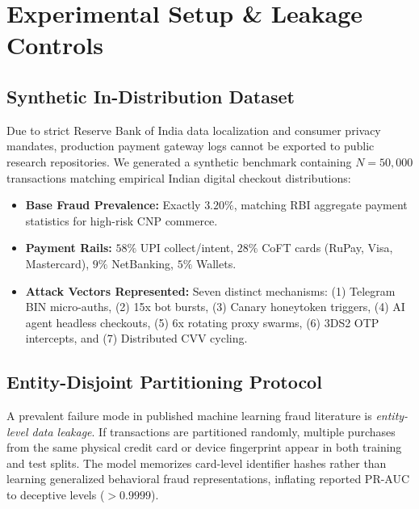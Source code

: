 \documentclass[conference]{IEEEtran}
\begin{document}
\section{Experimental Setup \& Leakage Controls}
\label{sec:setup}

\subsection{Synthetic In-Distribution Dataset}
Due to strict Reserve Bank of India data localization and consumer privacy mandates, production payment gateway logs cannot be exported to public research repositories. We generated a synthetic benchmark containing $N = 50,000$ transactions matching empirical Indian digital checkout distributions:
\begin{itemize}
    \item \textbf{Base Fraud Prevalence:} Exactly $3.20\%$, matching RBI aggregate payment statistics for high-risk CNP commerce.
    \item \textbf{Payment Rails:} $58\%$ UPI collect/intent, $28\%$ CoFT cards (RuPay, Visa, Mastercard), $9\%$ NetBanking, $5\%$ Wallets.
    \item \textbf{Attack Vectors Represented:} Seven distinct mechanisms: (1) Telegram BIN micro-auths, (2) 15x bot bursts, (3) Canary honeytoken triggers, (4) AI agent headless checkouts, (5) 6x rotating proxy swarms, (6) 3DS2 OTP intercepts, and (7) Distributed CVV cycling.
\end{itemize}

\subsection{Entity-Disjoint Partitioning Protocol}
\label{sec:leakage_audit}
A prevalent failure mode in published machine learning fraud literature is \textit{entity-level data leakage}. If transactions are partitioned randomly, multiple purchases from the same physical credit card or device fingerprint appear in both training and test splits. The model memorizes card-level identifier hashes rather than learning generalized behavioral fraud representations, inflating reported PR-AUC to deceptive levels ($>0.9999$).
\end{document}
